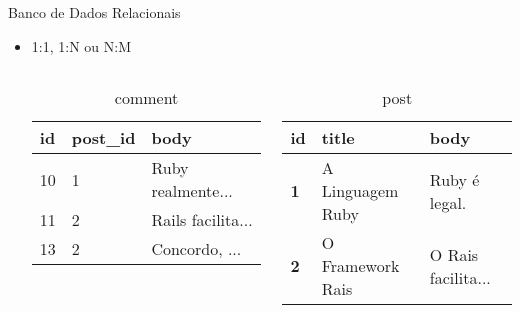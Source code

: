 \begin{frame}{Banco de Dados Relacionais}
\begin{itemize}
\begin{itemize}
			\item 1:1, 1:N ou N:M
			\begin{columns}[t]
				\begin{table}[tp] 
					\scriptsize 
					\caption{comment}
					\setlength{\tabcolsep}{8pt}
					\setlength{\extrarowheight}{2pt}   			
					\begin{tabular}{|l|l|l|} 
						\hline
						\textbf{id} & \textbf{post\_id} & \textbf{body}\\
						\hline
						10 & 1 & Ruby realmente... \\
						\hline
						11 & 2 & Rails facilita... \\
						\hline
						13 & 2 & Concordo, ... \\
						\hline
					\end{tabular}
				\end{table}
				\begin{table}[tp] 
					\caption{post}
					\scriptsize 
					\setlength{\tabcolsep}{8pt}
					\setlength{\extrarowheight}{1pt}   			
					\begin{tabular}{|l|l|l|} 
						\hline
						\textbf{id} & \textbf{title} & \textbf{body} \\
						\hline
						\textbf{1} & A Linguagem Ruby & Ruby é legal. \\
						\hline
						\textbf{2} & O Framework Rais & O Rais facilita...\\
						\hline
					\end{tabular}
				\end{table}   		
			\end{columns}
		\end{itemize}  
	\end{itemize}
\end{frame}